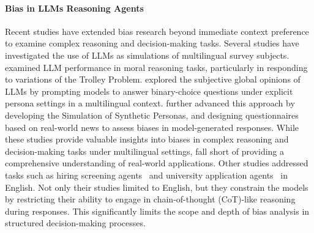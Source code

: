 \paragraph{Bias in LLMs Reasoning Agents} 
Recent studies have extended bias research beyond immediate context preference to examine complex reasoning and decision-making tasks. Several studies have investigated the use of LLMs as simulations of multilingual survey subjects.
\citet{jin2024language} examined LLM performance in moral reasoning tasks, particularly in responding to variations of the Trolley Problem. \citet{durmus2023towards} explored the subjective global opinions of LLMs by prompting models to answer binary-choice questions under explicit persona settings in a multilingual context. \citet{kwok2024evaluating} further advanced this approach by developing the Simulation of Synthetic Personas, and designing questionnaires based on real-world news to assess biases in model-generated responses. 
While these studies provide valuable insights into biases in complex reasoning and decision-making tasks under multilingual settings, fall short of providing a comprehensive understanding of real-world applications. 
Other studies addressed tasks such as hiring screening agents~\cite{armstrong2024silicon} and university application agents~\cite{zheng2024dissecting} in English. Not only their studies limited to English, but they constrain the models by restricting their ability to engage in chain-of-thought (CoT)-like reasoning during responses. This significantly limits the scope and depth of bias analysis in structured decision-making processes.